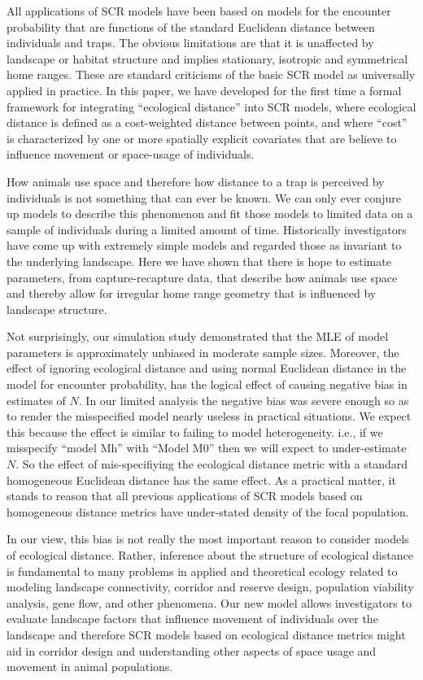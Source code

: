 \documentclass[12pt]{article}
\begin{document}
All applications of SCR models have been based on models for the
encounter probability that are functions of
the standard Euclidean distance between
individuals and traps. The obvious limitations are that it is
unaffected by landscape or habitat structure and implies
stationary,  isotropic and symmetrical home ranges. These are standard
criticisms of the basic SCR model as universally applied in practice.
In this paper,  we have developed for the first time a formal framework
for integrating
``ecological distance'' into SCR models, where ecological distance is
defined as a cost-weighted distance between points, and where ``cost''
is characterized by one or more spatially explicit covariates that are
believe to influence movement or space-usage of individuals.

How animals use space and therefore how distance to a trap is
perceived by individuals is not something that can ever be known. We
can only ever conjure up models to describe this
phenomenon and fit those models to limited data on a sample of individuals
during a limited amount of time.
Historically investigators have come up with extremely simple
models and regarded those as invariant to
the underlying landscape. Here we have shown that there is hope to
estimate parameters, from capture-recapture data,
 that describe how animals use space and thereby
allow for irregular home range geometry that is influenced by
landscape structure.

Not surprisingly, our simulation study demonstrated that the MLE of model
parameters is approximately unbiased in moderate sample
sizes. Moreover, the
effect of ignoring ecological distance and using normal Euclidean
distance in the model for encounter probability, has the
logical effect of causing negative bias
in estimates of $N$. In our limited analysis the negative bias was
severe enough so as to render the misspecified model nearly useless in
practical situations. We expect this because the effect is similar to
failing to model heterogeneity. i.e., if we misspecify ``model Mh'' with
``Model M0'' then we will expect to under-estimate $N$. So the effect of
mis-specifiying the ecological distance metric with a standard
homogeneous Euclidean distance has the same effect. As a practical matter,
it stands to reason that all previous applications of SCR models based
on homogeneous distance metrics have under-stated density of the focal
population.

In our view, this bias is not really the most important reason to consider models of
ecological distance. Rather, inference about the structure of
ecological distance is fundamental to many problems in applied and
theoretical ecology related to modeling landscape
connectivity, corridor and reserve design, population viability
analysis, gene flow, and other phenomena.
Our new model
allows investigators to  evaluate landscape
factors that influence movement of individuals over the landscape and
therefore SCR models based on ecological distance metrics might aid in
corridor design and understanding other aspects of space usage and
movement in animal populations.
\end{document}
